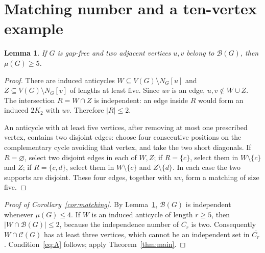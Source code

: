 \documentclass[11pt,a4paper]{article}
\newtheorem{lemma}[theorem]{Lemma}
\theoremstyle{remark}\newtheorem{remark}[theorem]{Remark}
\newcommand{\Bad}{\mathcal B}
\newcommand{\Good}{\mathcal C}
\begin{document}
\section{Matching number and a ten-vertex example}\label{sec:example}
\begin{lemma}\label{lem:match}
If $G$ is gap-free and two adjacent vertices $u,v$ belong to $\Bad(G)$, then $\mu(G)\ge5$.
\end{lemma}
\begin{proof}
There are induced anticycles $W\subseteq V(G)\setminus N_G[u]$ and $Z\subseteq V(G)\setminus N_G[v]$ of lengths at least five. Since $uv$ is an edge, $u,v\notin W\cup Z$. The intersection $R=W\cap Z$ is independent: an edge inside $R$ would form an induced $2K_2$ with $uv$. Therefore $|R|\le2$.

An anticycle with at least five vertices, after removing at most one prescribed vertex, contains two disjoint edges: choose four consecutive positions on the complementary cycle avoiding that vertex, and take the two short diagonals. If $R=\varnothing$, select two disjoint edges in each of $W,Z$; if $R=\{c\}$, select them in $W\setminus\{c\}$ and $Z$; if $R=\{c,d\}$, select them in $W\setminus\{c\}$ and $Z\setminus\{d\}$. In each case the two supports are disjoint. These four edges, together with $uv$, form a matching of size five.
\end{proof}
\begin{proof}[Proof of Corollary~\ref{cor:matching}]
By Lemma~\ref{lem:match}, $\Bad(G)$ is independent whenever $\mu(G)\le4$. If $W$ is an induced anticycle of length $r\ge5$, then $|W\cap\Bad(G)|\le2$, because the independence number of $\overline{C_r}$ is two. Consequently $W\cap\Good(G)$ has at least three vertices, which cannot be an independent set in $\overline{C_r}$. Condition~\eqref{eq:A} follows; apply Theorem~\ref{thm:main}.
\end{proof}
\end{document}
